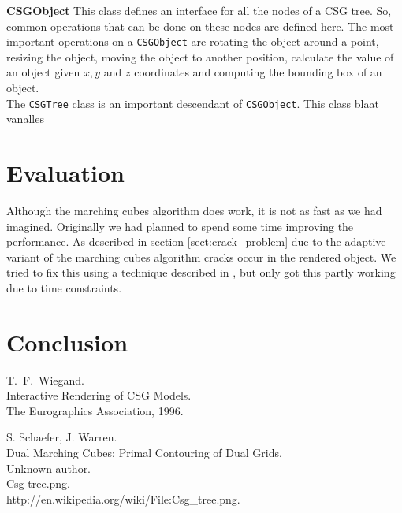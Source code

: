 \documentclass[a4paper,10pt,twocolumn]{article}
\begin{document}
\begin{list}{}{\leftmargin=0em}
    \item[] \textbf{CSGObject} This class defines an interface for all the nodes of a CSG tree. So, common operations that can be done on these nodes are defined here. The most important operations on a \texttt{CSGObject} are rotating the object around a point, resizing the object, moving the object to another position, calculate the value of an object given $x, y$ and $z$ coordinates and computing the bounding box of an object.\\
        
        The \texttt{CSGTree} class is an important descendant of \texttt{CSGObject}. This class blaat vanalles
\end{list}

\section{Evaluation}

Although the marching cubes algorithm does work, it is not as fast as we had imagined. Originally we had planned to spend some time improving the performance. As described in section \ref{sect:crack_problem} due to the adaptive variant of the marching cubes algorithm cracks occur in the rendered object. We tried to fix this using a technique described in \cite{DMC}, but only got this partly working due to time constraints.


\section{Conclusion}


\begin{thebibliography}{99}
    T.~F.~Wiegand.\\
    Interactive Rendering of CSG Models.\\
    The Eurographics Association, 1996.

    S. Schaefer, J. Warren. \\
    Dual Marching Cubes: Primal Contouring of Dual Grids. \\

    Unknown author.\\
    Csg tree.png.\\
    http://en.wikipedia.org/wiki/File:Csg\_tree.png.\\
\end{thebibliography}
\end{document}
